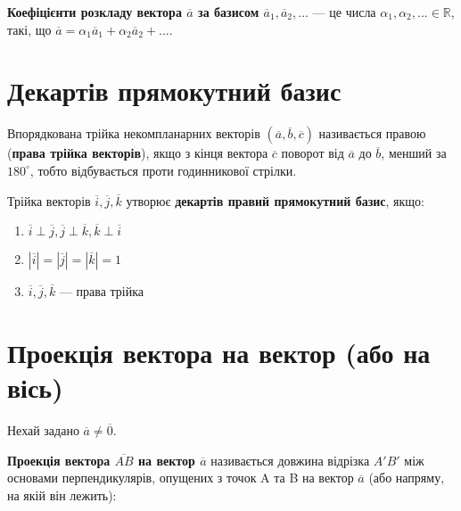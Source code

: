 \begin{definition}	
	\textbf{Коефіцієнти розкладу вектора $\overline{a}$ за базисом $\overline{a}_1, \overline{a}_2, ...$} --- це числа $\alpha_1, \alpha_2, ... \in \mathbb{R}$, такі, що $\overline{a} = \alpha_1\overline{a}_1 + \alpha_2\overline{a}_2 + ...$.
\end{definition}

\section{Декартів прямокутний базис}

\begin{definition}
	Впорядкована трійка некомпланарних векторів $(\overline{a}, \overline{b}, \overline{c})$ називається правою (\textbf{права трійка векторів}),
	якщо з кінця вектора $\overline{c}$ поворот від $\overline{a}$ до $\overline{b}$, менший за $180^{\circ}$, тобто відбувається проти
	годинникової стрілки.
\end{definition}

\begin{definition}
	Трійка векторів $\overline{i}, \overline{j}, \overline{k}$ утворює \textbf{декартів правий прямокутний базис}, якщо: 
	\begin{enumerate}
		\item $\overline{i} \perp \overline{j}, \overline{j} \perp \overline{k}, \overline{k} \perp \overline{i}$
		\item $|\overline{i}| = |\overline{j}| = |\overline{k}| = 1$
		\item $\overline{i}, \overline{j}, \overline{k}$ --- права трійка
	\end{enumerate}
\end{definition}

\section{Проекція вектора на вектор (або на вісь)}

Нехай задано $\overline{a} \neq \overline{0}$.

\begin{definition}
	\textbf{Проекція вектора $\overline{AB}$ на вектор $\overline{a}$} називається довжина відрізка $A'B'$ між основами перпендикулярів, опущених з точок A та B на вектор $\overline{a}$ (або напряму, на якій він лежить): 
\end{definition}

